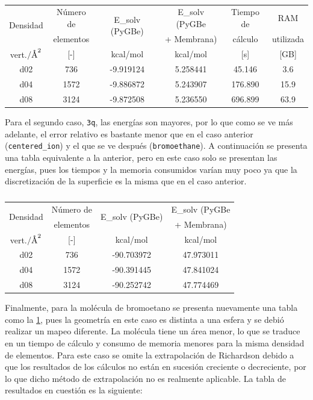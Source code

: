 \documentclass[12pt, oneside, numbers, spanish]{ezthesis}
\numberwithin{equation}{section}
\newcommand{\angstrom}{\text{\normalfont\AA}}
\begin{document}
\begin{table}[H]
	\centering
	\caption{}
	\def\arraystretch{0.8}
	\begin{tabular}{|cccccc|}\hline
		\multirow{2}{*}{Densidad} & Número de & \multirow{2}{*}{E\_solv (PyGBe)} & E\_solv (PyGBe & Tiempo de & RAM\\
		 & elementos &  & + Membrana) & cálculo & utilizada\\\hline
		vert.$/\angstrom^2$ & \rule{0pt}{15pt}[-] & kcal/mol & kcal/mol & [s] & [GB] \\\hline
		d02 & 736 & -9.919124 & 5.258441 & 45.146 & 3.6\\
		d04 & 1572 & -9.886872 & 5.243907 & 176.890 & 15.9\\
		d08 & 3124 & -9.872508 & 5.236550 & 696.899 & 63.9 \\ \hline
	\end{tabular}\label{table:pygbe_centered_ion}
\end{table}
\noindent
Para el segundo caso, \texttt{3q}, las energías son mayores, por lo que como se ve más adelante, el error relativo es bastante menor que en el caso anterior (\texttt{centered\_ion}) y el que se ve después (\texttt{bromoethane}). A continuación se presenta una tabla equivalente a la anterior, pero en este caso solo se presentan las energías, pues los tiempos y la memoria consumidos varían muy poco ya que la discretización de la superficie es la misma que en el caso anterior.

\begin{table}[H]
	\centering
	\caption{}
	\def\arraystretch{0.8}
	\begin{tabular}{|cccc|}\hline
		\multirow{2}{*}{Densidad} & Número de & \multirow{2}{*}{E\_solv (PyGBe)} & E\_solv (PyGBe \\
		& elementos &  & + Membrana) \\\hline
		\rule{0pt}{15pt} vert.$/\angstrom^2$ & [-] & kcal/mol & kcal/mol \\\hline
		d02 & 736 & -90.703972 & 47.973011 \\
		d04 & 1572 & -90.391445 & 47.841024 \\
		d08 & 3124 & -90.252742 & 47.774469 \\ \hline
	\end{tabular}\label{table:pygbe_3q}
\end{table}
\noindent
Finalmente, para la molécula de bromoetano se presenta nuevamente una tabla como la \ref{table:pygbe_centered_ion}, pues la geometría en este caso es distinta a una esfera y se debió realizar un mapeo diferente. La molécula tiene un área menor, lo que se traduce en un tiempo de cálculo y consumo de memoria menores para la misma densidad de elementos. Para este caso se omite la extrapolación de Richardson debido a que los resultados de los cálculos no están en sucesión creciente o decreciente, por lo que dicho método de extrapolación no es realmente aplicable. La tabla de resultados en cuestión es la siguiente:
\end{document}
